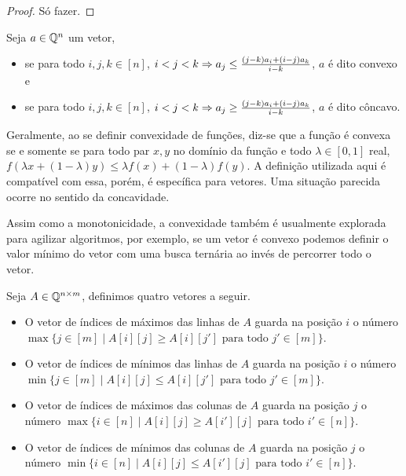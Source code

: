\begin{proof}
Só fazer.
\end{proof}

\begin{defi}
Seja $a \in \mathbb{Q}^n$ um vetor,
    \begin{itemize}
        \item se para todo $i,j,k \in [n]$, $i < j < k \Rightarrow a_j \leq \frac{(j-k)a_i + (i-j)a_k}{i-k}$, $a$ é dito convexo e
        \item se para todo $i,j,k \in [n]$, $i < j < k \Rightarrow a_j \geq \frac{(j-k)a_i + (i-j)a_k}{i-k}$, $a$ é dito côncavo.
    \end{itemize}
\end{defi}

Geralmente, ao se definir convexidade de funções, diz-se que a função é convexa se e somente se para todo par $x,y$ no domínio da função e todo $\lambda \in [0,1]$ real, $f(\lambda x + (1 - \lambda)y) \leq \lambda f(x) + (1 - \lambda) f(y)$. A definição utilizada aqui é compatível com essa, porém, é específica para vetores. Uma situação parecida ocorre no sentido da concavidade.

Assim como a monotonicidade, a convexidade também é usualmente explorada para agilizar algoritmos, por exemplo, se um vetor é convexo podemos definir o valor mínimo do vetor com uma busca ternária ao invés de percorrer todo o vetor.  

\begin{defi}
Seja $A \in \mathbb{Q}^{n \times m}$, definimos quatro vetores a seguir.
    \begin{itemize}
        \item O vetor de índices de máximos das linhas de $A$ guarda na posição $i$ 
              o número $\max\{j \in [m] \mid A[i][j] \geq A[i][j'] \text{ para todo } j' \in [m]\}$. 
        \item O vetor de índices de mínimos das linhas de $A$ guarda na posição $i$ 
              o número $\min\{j \in [m] \mid A[i][j] \leq A[i][j'] \text{ para todo } j' \in [m]\}$. 
        \item O vetor de índices de máximos das colunas de $A$ guarda na posição $j$ 
              o número $\max\{i \in [n] \mid A[i][j] \geq A[i'][j] \text{ para todo } i' \in [n]\}$. 
        \item O vetor de índices de mínimos das colunas de $A$ guarda na posição $j$ 
              o número $\min\{i \in [n] \mid A[i][j] \leq A[i'][j] \text{ para todo } i' \in [n]\}$. 
    \end{itemize}
\end{defi}

